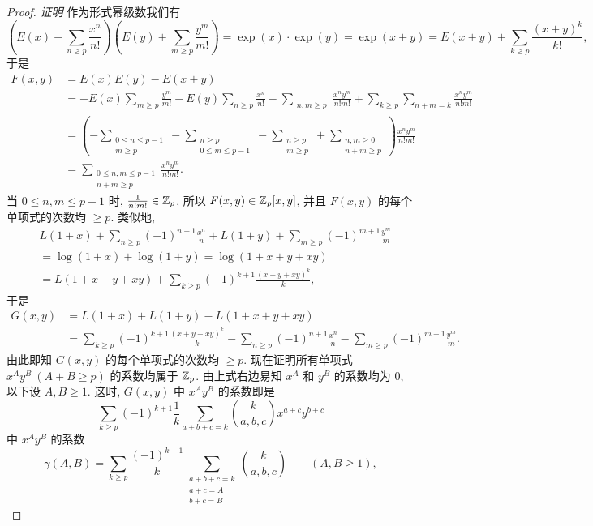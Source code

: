\begin{proof}
\emph{证明} 作为形式幂级数我们有
\[
  \left(E(x)+\sum_{n\geqslant p}\frac{x^n}{n!}\right)
  \left(E(y)+\sum_{m\geqslant p}\frac{y^m}{m!}\right)
  =\exp(x)\cdot\exp(y)
  =\exp(x+y)=E(x+y)+\sum_{k\geqslant p}\frac{(x+y)^k}{k!},
\]
于是
\begin{align*}
  F(x,y)&=E(x)E(y)-E(x+y)\\
  &=-E(x)\sum_{m\geqslant p}\frac{y^m}{m!}-E(y)\sum_{n\geqslant p}\frac{x^n}{n!}
  -\sum_{\substack{n,m\geqslant p}}\frac{x^ny^m}{n!m!}
  +\sum_{k\geqslant p}\sum_{n+m=k}\frac{x^ny^m}{n!m!}\\
  &=\left(-\sum_{\substack{0\leqslant n\leqslant p-1\\ m\geqslant p}}
  -\sum_{\substack{n\geqslant p\\ 0\leqslant m\leqslant p-1}}
  -\sum_{\substack{n\geqslant p\\ m\geqslant p}}
  +\sum_{\substack{n,m\geqslant 0\\ n+m\geqslant p}}\right)\frac{x^ny^m}{n!m!}\\
  &=\sum_{\substack{0\leqslant n,m\leqslant p-1\\ n+m\geqslant p}}\frac{x^ny^m}{n!m!}.
\end{align*}
当 $0\leqslant n,m\leqslant p-1$ 时, $\frac{1}{n!m!}\in\mathbb{Z}_p$, 所以 $F(x,y)\in\mathbb{Z}_p[x,y]$, 并且 $F(x,y)$ 的每个单项式的次数均 $\geqslant p$. 类似地,
\[
  \begin{aligned}
    &L(1+x)+\sum_{n\geqslant p}(-1)^{n+1}\frac{x^n}{n}
    +L(1+y)+\sum_{m\geqslant p}(-1)^{m+1}\frac{y^m}{m}\\
    &=\log(1+x)+\log(1+y)=\log(1+x+y+xy)\\
    &=L(1+x+y+xy)+\sum_{k\geqslant p}(-1)^{k+1}\frac{(x+y+xy)^k}{k},
  \end{aligned}
\]
于是
\[
  \begin{aligned}
    G(x,y)&=L(1+x)+L(1+y)-L(1+x+y+xy)\\
    &=\sum_{k\geqslant p}(-1)^{k+1}\frac{(x+y+xy)^k}{k}
    -\sum_{n\geqslant p}(-1)^{n+1}\frac{x^n}{n}
    -\sum_{m\geqslant p}(-1)^{m+1}\frac{y^m}{m}.
  \end{aligned}
\]
由此即知 $G(x,y)$ 的每个单项式的次数均 $\geqslant p$. 现在证明所有单项式 $x^Ay^B\ (A+B\geqslant p)$ 的系数均属于 $\mathbb{Z}_p$. 由上式右边易知 $x^A$ 和 $y^B$ 的系数均为 $0$, 以下设 $A,B\geqslant 1$. 这时, $G(x,y)$ 中 $x^Ay^B$ 的系数即是
\[
  \sum_{k\geqslant p}(-1)^{k+1}\frac{1}{k}
  \sum_{a+b+c=k}\binom{k}{a,b,c}x^{a+c}y^{b+c}
\]
中 $x^Ay^B$ 的系数
\[
  \gamma(A,B)=\sum_{k\geqslant p}\frac{(-1)^{k+1}}{k}
  \sum_{\substack{a+b+c=k\\ a+c=A\\ b+c=B}}\binom{k}{a,b,c}\qquad(A,B\geqslant 1),
\]
\end{proof}
